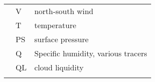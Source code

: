 \begin{longtable}[]{@{}lll@{}}
\begin{minipage}[t]{0.30\columnwidth}\raggedright
\strut
\end{minipage} & \begin{minipage}[t]{0.30\columnwidth}\raggedright
V\strut
\end{minipage} & \begin{minipage}[t]{0.30\columnwidth}\raggedright
north-south wind\strut
\end{minipage}\tabularnewline
\begin{minipage}[t]{0.30\columnwidth}\raggedright
\strut
\end{minipage} & \begin{minipage}[t]{0.30\columnwidth}\raggedright
T\strut
\end{minipage} & \begin{minipage}[t]{0.30\columnwidth}\raggedright
temperature\strut
\end{minipage}\tabularnewline
\begin{minipage}[t]{0.30\columnwidth}\raggedright
\strut
\end{minipage} & \begin{minipage}[t]{0.30\columnwidth}\raggedright
PS\strut
\end{minipage} & \begin{minipage}[t]{0.30\columnwidth}\raggedright
surface pressure\strut
\end{minipage}\tabularnewline
\begin{minipage}[t]{0.30\columnwidth}\raggedright
\strut
\end{minipage} & \begin{minipage}[t]{0.30\columnwidth}\raggedright
Q\strut
\end{minipage} & \begin{minipage}[t]{0.30\columnwidth}\raggedright
Specific humidity, various tracers\strut
\end{minipage}\tabularnewline
\begin{minipage}[t]{0.30\columnwidth}\raggedright
\strut
\end{minipage} & \begin{minipage}[t]{0.30\columnwidth}\raggedright
QL\strut
\end{minipage} & \begin{minipage}[t]{0.30\columnwidth}\raggedright
cloud liquidity\strut
\end{minipage}\tabularnewline
\begin{minipage}[t]{0.30\columnwidth}\raggedright
\strut
\end{minipage} & \begin{minipage}[t]{0.30\columnwidth}\raggedright

\end{minipage}
\end{longtable}
